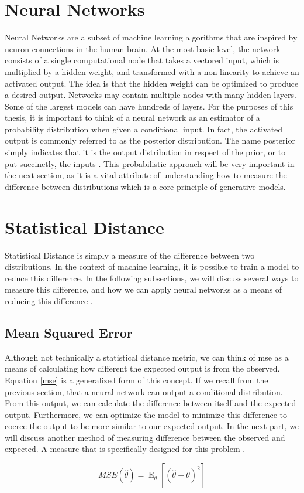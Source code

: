 \section{Neural Networks}
Neural Networks are a subset of machine learning algorithms that are inspired by neuron connections in the human brain. At the most basic level, the network consists of a single computational node that takes a vectored input, which is multiplied by a hidden weight, and transformed with a non-linearity to achieve an activated output. The idea is that the hidden weight can be optimized to produce a desired output. Networks may contain multiple nodes with many hidden layers. Some of the largest models can have hundreds of layers. For the purposes of this thesis, it is important to think of a neural network as an estimator of a probability distribution when given a conditional input. In fact, the activated output is commonly referred to as the posterior distribution. The name posterior simply indicates that it is the output distribution in respect of the prior, or to put succinctly, the inputs \cite{Goodfellow-et-al-2016}. This probabilistic approach will be very important in the next section, as it is a vital attribute of understanding how to measure the difference between distributions which is a core principle of generative models.

\section{Statistical Distance}
Statistical Distance is simply a measure of the difference between two distributions. In the context of machine learning, it is possible to train a model to reduce this difference. In the following subsections, we will discuss several ways to measure this difference, and how we can apply neural networks as a means of reducing this difference \cite{Goodfellow-et-al-2016}.

\subsection{Mean Squared Error}
Although not technically a statistical distance metric, we can think of \acrfull{mse} as a means of calculating how different the expected output is from the observed. Equation \ref{mse} is a generalized form of this concept. If we recall from the previous section, that a neural network can output a conditional distribution. From this output, we can calculate the difference between itself and the expected output. Furthermore, we can optimize the model to minimize this difference to coerce the output to be more similar to our expected output. In the next part, we will discuss another method of measuring difference between the observed and expected. A measure that is specifically designed for this problem \cite{Goodfellow-et-al-2016}.
\begin{center}
    \begin{equation}
    \label{mse}
        {MSE} ({\hat {\theta }})=\operatorname {E} _{\theta }\left[({\hat {\theta }}-\theta )^{2}\right]
    \end{equation}
\end{center}

